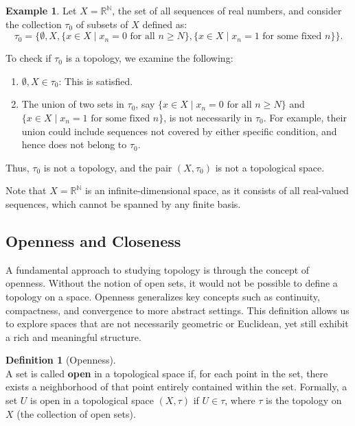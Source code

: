 \documentclass[12pt, reqno]{amsart}
\theoremstyle{definition}
\newtheorem{definition}[theorem]{Definition}
\newtheorem{example}[theorem]{Example}
\numberwithin{equation}{section}
\newcommand{\dR}{{\mathbb R}}
\newcommand{\dN}{{\mathbb N}}
\begin{document}
\begin{example}
    Let \( X = \dR^\dN \), the set of all sequences of real numbers, and consider the collection \( \tau_0 \) of subsets of \( X \) defined as:
    $$
    \tau_0 = \{\emptyset, X, \{x \in X \mid x_n = 0 \text{ for all } n \geq N\}, \{x \in X \mid x_n = 1 \text{ for some fixed } n\}\}.
    $$

    To check if \( \tau_0 \) is a topology, we examine the following:
    \begin{enumerate}
        \item \(\emptyset, X \in \tau_0\): This is satisfied.
        \item The union of two sets in \( \tau_0 \), say \( \{x \in X \mid x_n = 0 \text{ for all } n \geq N\} \) and \( \{x \in X \mid x_n = 1 \text{ for some fixed } n\} \), is not necessarily in \( \tau_0 \). For example, their union could include sequences not covered by either specific condition, and hence does not belong to \( \tau_0 \).
    \end{enumerate}

    Thus, \( \tau_0 \) is not a topology, and the pair \( (X, \tau_0) \) is not a topological space.

    Note that \( X = \dR^\dN \) is an infinite-dimensional space, as it consists of all real-valued sequences, which cannot be spanned by any finite basis.
\end{example}


\subsection{Openness and Closeness}
A fundamental approach to studying topology is through the concept of openness. Without the notion of open sets, it would not be possible to define a topology on a space. Openness generalizes key concepts such as continuity, compactness, and convergence to more abstract settings. This definition allows us to explore spaces that are not necessarily geometric or Euclidean, yet still exhibit a rich and meaningful structure.

\begin{definition}[Openness] \hfill\\
A set is called \textbf{open} in a topological space if, for each point in the set, there exists a neighborhood of that point entirely contained within the set. Formally, a set $U$ is open in a topological space $(X, \tau)$ if $U \in \tau$, where $\tau$ is the topology on $X$ (the collection of open sets).
\end{definition}
\end{document}
